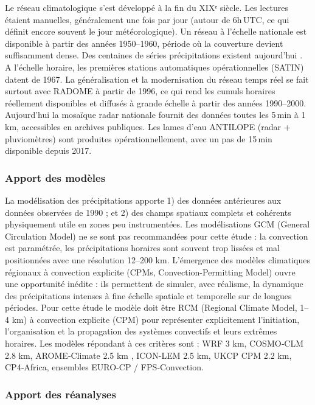 \documentclass[
  article,
  nofooter,
  noheadings]{jss}
\begin{document}
Le réseau climatologique s'est développé à la fin du XIXᵉ siècle. Les
lectures étaient manuelles, généralement une fois par jour (autour de
6h\,UTC, ce qui définit encore souvent le jour météorologique). Un
réseau à l'échelle nationale est disponible à partir des années
1950--1960, période où la couverture devient suffisamment dense. Des
centaines de séries précipitations existent aujourd'hui
\citep{meteo-france_2020_breve_observation_classique}. A l'échelle
horaire, les premières stations automatiques opérationnelles (SATIN)
datent de 1967. La généralisation et la modernisation du réseau temps
réel se fait surtout avec RADOME à partir de 1996, ce qui rend les
cumuls horaires réellement disponibles et diffusés à grande échelle à
partir des années 1990--2000. Aujourd'hui la mosaïque radar nationale
fournit des données toutes les 5\,min à 1\,km, accessibles en archives
publiques. Les lames d'eau ANTILOPE (radar + pluviomètres) sont
produites opérationnellement, avec un pas de 15\,min disponible depuis
2017.

\subsubsection{Apport des modèles}\label{apport-des-moduxe8les}

La modélisation des précipitations apporte 1) des données antérieures
aux données observées de 1990 ; et 2) des champs spatiaux complets et
cohérents physiquement utile en zones peu instrumentées. Les
modélisations GCM (General Circulation Model) ne se sont pas
recommandées pour cette étude : la convection est paramétrée, les
précipitations horaires sont souvent trop lissées et mal positionnées
avec une résolution 12--200 km. L'émergence des modèles climatiques
régionaux à convection explicite (CPMs, Convection-Permitting Model)
ouvre une opportunité inédite : ils permettent de simuler, avec
réalisme, la dynamique des précipitations intenses à fine échelle
spatiale et temporelle sur de longues périodes. Pour cette étude le
modèle doit être RCM (Regional Climate Model, 1--4 km) à convection
explicite (CPM) pour représenter explicitement l'initiation,
l'organisation et la propagation des systèmes convectifs et leurs
extrêmes horaires. Les modèles répondant à ces critères sont : WRF 3 km,
COSMO‑CLM 2.8 km, AROME‑Climate 2.5 km \citep{cnrm_arome2007}, ICON-LEM
2.5 km, UKCP CPM 2.2 km, CP4‑Africa, ensembles EURO-CP / FPS‑Convection.

\subsubsection{Apport des réanalyses}\label{apport-des-ruxe9analyses}
\end{document}
